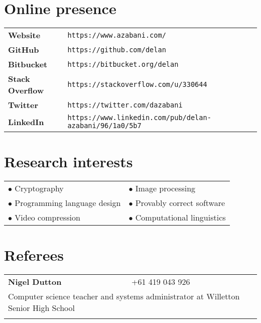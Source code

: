 \documentclass[a4paper,12pt]{article}
\begin{document}
\newpage

\section*{Online presence}

\begin{tabular}{p{3.5cm}p{12.5cm}}
	\textbf{Website} &
		\texttt{https://www.azabani.com/}\\
	\textbf{GitHub} &
		\texttt{https://github.com/delan}\\
	\textbf{Bitbucket} &
		\texttt{https://bitbucket.org/delan}\\
	\textbf{Stack Overflow} &
		\texttt{https://stackoverflow.com/u/330644}\\
	\textbf{Twitter} &
		\texttt{https://twitter.com/dazabani}\\
	\textbf{LinkedIn} &
		\texttt{https://www.linkedin.com/pub/delan-azabani/96/1a0/5b7}
\end{tabular}

\section*{Research interests}

\begin{tabular}{p{8cm}p{8cm}}
	$\bullet$ Cryptography &
	$\bullet$ Image processing \\
	$\bullet$ Programming language design &
	$\bullet$ Provably correct software \\
	$\bullet$ Video compression &
	$\bullet$ Computational linguistics
\end{tabular}

\section*{Referees}

\begin{tabular}{p{3.5cm}p{12.5cm}}
	\textbf{Nigel Dutton} &
		+61 419 043 926\\
	\multicolumn{2}{p{17cm}}{
		Computer science teacher and systems administrator
		at Willetton Senior High School
	}\\\\
\end{tabular}
\end{document}
